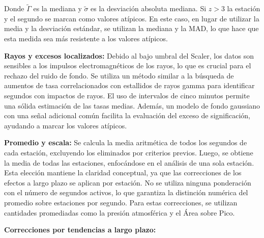 Donde $\tilde{\Gamma}$ es la mediana y $\tilde{\sigma}$ es la desviación absoluta mediana.  Si  $z>3$ la estación y el segundo se marcan como valores atípicos. En este caso, en lugar de utilizar la media y la desviación estándar, se utilizan la mediana y la MAD, lo que hace que esta medida sea más resistente a los valores atípicos.

\textbf{Rayos y excesos localizados:} Debido al bajo umbral del Scaler, los datos son sensibles a los impulsos electromagnéticos de los rayos, lo que es crucial para el rechazo del ruido de fondo. Se utiliza un método similar a la búsqueda de aumentos de tasa correlacionados con estallidos de rayos gamma para identificar segundos con impactos de rayos. El uso de intervalos de cinco minutos permite una sólida estimación de las tasas medias. Además, un modelo de fondo gaussiano con una señal adicional común facilita la evaluación del exceso de significación, ayudando a marcar los valores atípicos.

\textbf{Promedio y escala:} Se calcula la media aritmética de todos los segundos de cada estación, excluyendo los eliminados por criterios previos. Luego, se obtiene la media de todas las estaciones, enfocándose en el análisis de una sola estación. Esta elección mantiene la claridad conceptual, ya que las correcciones de los efectos a largo plazo se aplican por estación. No se utiliza ninguna ponderación con el número de segundos activos, lo que garantiza la distinción numérica del promedio sobre estaciones por segundo. Para estas correcciones, se utilizan cantidades promediadas como la presión atmosférica y el Área sobre Pico.

\textbf{Correcciones por tendencias a largo plazo:} 

